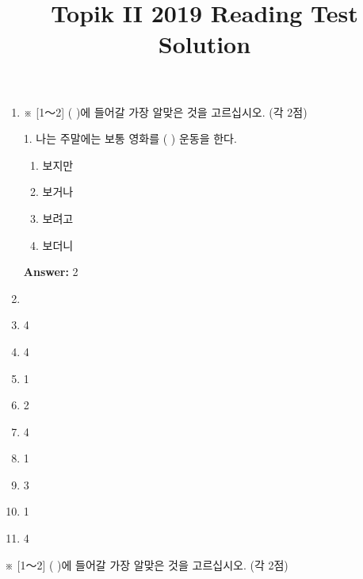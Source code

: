 \documentclass[12pt]{article}
\begin{document}
\title{Topik II 2019 Reading Test Solution}
\maketitle

\begin{enumerate}[1.]
    \item ※ [1～2] (   )에 들어갈 가장 알맞은 것을 고르십시오. (각 2점)

    \bigskip

    1. 나는 주말에는 보통 영화를 (       ) 운동을 한다.

    \bigskip

    \begin{enumerate}[1)]
        \item 보지만
        \item 보거나
        \item 보려고
        \item 보더니
    \end{enumerate}

    \bigskip

    \textbf{Answer:} 2
    \item
    \item 4
    \item 4
    \item 1
    \item 2
    \item 4
    \item 1
    \item 3
    \item 1
    \item 4
\end{enumerate}

※ [1～2] (   )에 들어갈 가장 알맞은 것을 고르십시오. (각 2점)
\end{document}

